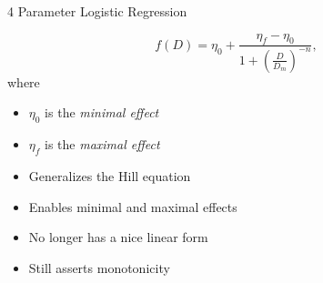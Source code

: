 \documentclass{beamer}
\begin{document}
\begin{frame}{4 Parameter Logistic Regression}
    \begin{Definition}
        \[
            f(D) = \eta_0 + \frac{\eta_f - \eta_0}{1 + \left(\frac{D}{D_m}\right)^{-n}},
        \]
        where \begin{itemize}
            \item $\eta_0$ is the \textit{minimal effect}
            \item $\eta_f$ is the \textit{maximal effect}
        \end{itemize}
    \end{Definition}
    \vfill
    \begin{itemize}
        \item Generalizes the Hill equation 
        \item Enables minimal and maximal effects 
        \item No longer has a nice linear form 
        \item Still asserts monotonicity
    \end{itemize}
\end{frame}
\end{document}
